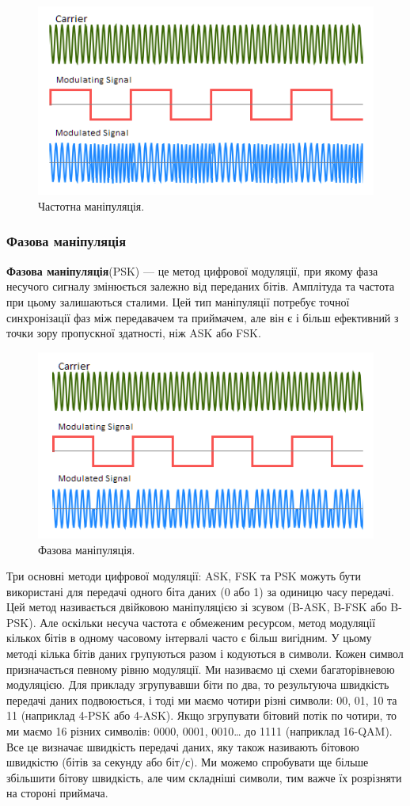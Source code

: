 \documentclass{article}
\begin{document}
\begin{figure}[h!]
	\centering
	\includegraphics[width=0.6\linewidth]{images/fsk.png}
	\caption{\label{fig:fsk}Частотна маніпуляція.}
\end{figure}

\subsubsection{Фазова маніпуляція}
\textbf{Фазова маніпуляція}(PSK) --- це метод цифрової модуляції, при якому фаза несучого сигналу змінюється залежно від переданих бітів. Амплітуда та частота при цьому залишаються сталими. Цей тип маніпуляції потребує точної синхронізації фаз між передавачем та приймачем, але він є і більш ефективний з точки зору пропускної здатності, ніж ASK або FSK.

\begin{figure}[h!]
	\centering
	\includegraphics[width=0.6\linewidth]{images/psk.png}
	\caption{\label{fig:psk}Фазова маніпуляція.}
\end{figure}

Три основні методи цифрової модуляції: ASK, FSK та PSK можуть бути використані для передачі одного біта даних (0 або 1) за одиницю часу передачі. Цей метод називається двійковою маніпуляцією зі зсувом (B-ASK, B-FSK або B-PSK). Але оскільки несуча частота є обмеженим ресурсом, метод модуляції кількох бітів в одному часовому інтервалі часто є більш вигідним. У цьому методі кілька бітів даних групуються разом і кодуються в символи. Кожен символ призначається певному рівню модуляції. Ми називаємо ці схеми багаторівневою модуляцією. Для прикладу згрупувавши біти по два, то результуюча швидкість передачі даних подвоюється, і тоді ми маємо чотири різні символи: 00, 01, 10 та 11 (наприклад 4-PSK або 4-ASK). Якщо згрупувати бітовий потік по чотири, то ми маємо 16 різних символів: 0000, 0001, 0010… до 1111 (наприклад 16-QAM). Все це визначає швидкість передачі даних, яку також називають бітовою швидкістю (бітів за секунду або біт/с). Ми можемо спробувати ще більше збільшити бітову швидкість, але чим складніші символи, тим важче їх розрізняти на стороні приймача.
\end{document}
